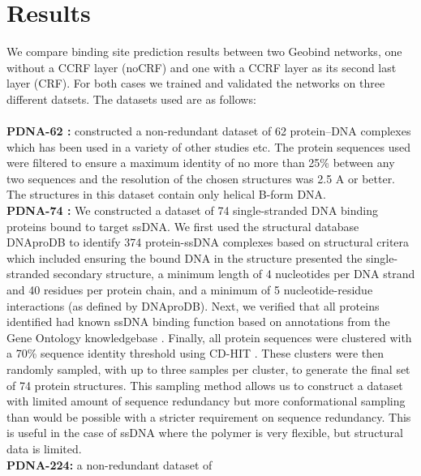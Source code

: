 \section{Results} We compare binding site prediction results between two Geobind networks, one
without a CCRF layer (noCRF) and one with a CCRF layer as its second last layer (CRF). For both
cases we trained and validated the networks on three different datsets. The datasets used are as
follows:\\ \\ \textbf{PDNA-62 :} \citet{ahmad2004analysis} constructed a non-redundant dataset of 62
protein–DNA complexes which has been used in a variety of other studies
\citep{kuznetsov2006transient, wang2006bindn} etc. The protein sequences used were filtered to
ensure a maximum identity of no more than 25\% between any two sequences and the resolution of the
chosen structures was 2.5 A or better. The structures in this dataset contain only helical B-form
DNA.\\ \textbf{PDNA-74 :} We constructed a dataset of 74 single-stranded DNA binding proteins bound
to target ssDNA. We first used the structural database DNAproDB
\citep{sagendorf2017dnaprodb,sagendorf2020dnaprodb} to identify 374 protein-ssDNA complexes based on
structural critera which included ensuring the bound DNA in the structure presented the
single-stranded secondary structure, a minimum length of 4 nucleotides per DNA strand and 40
residues per protein chain, and a minimum of 5 nucleotide-residue interactions (as defined by
DNAproDB). Next, we verified that all proteins identified had known ssDNA binding function based on
annotations from the Gene Ontology knowledgebase \citep{gene2019gene}.  Finally, all protein
sequences were clustered with a 70\% sequence identity threshold using CD-HIT \citep{li2006cd}.
These clusters were then randomly sampled, with up to three samples per cluster, to generate the
final set of 74 protein structures. This sampling method allows us to construct a dataset with
limited amount of sequence redundancy but more conformational sampling than would be possible with a
stricter requirement on sequence redundancy. This is useful in the case of ssDNA where the polymer
is very flexible, but structural data is limited.\\ \textbf{PDNA-224:} a non-redundant dataset of

